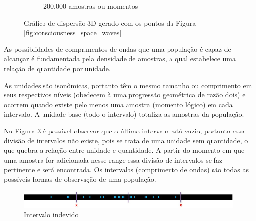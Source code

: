 \begin{figure}[H]
\begin{subfigure}[H]{0.47\linewidth}
		\caption{200.000 amostras ou momentos}
		\label{fig:consciousness_space_3DScatter_200000-2}
		\end{subfigure}%
	\caption{Gráfico de dispersão 3D gerado com os pontos da Figura \ref{fig:consciousness_space_waves}}
	\end{figure}

As possiblidades de comprimentos de ondas que uma população é capaz de alcançar é fundamentada pela densidade de amostras, a qual estabelece uma relação de quantidade por unidade. 

As unidades são isonômicas, portanto têm o mesmo tamanho ou comprimento em seus respectivos níveis (obedecem à uma progressão geométrica de razão dois) e ocorrem quando existe pelo menos uma amostra (momento lógico) em cada intervalo. A unidade base (todo o intervalo) totaliza as amostras da população. 

Na Figura \ref{fig:consciousness_space_subconsciousness_intervals} é possível observar que o último intervalo está vazio, portanto essa divisão de intervalos não existe, pois se trata de uma unidade sem quantidade, o que quebra a relação entre unidade e quantidade. A partir do momento em que uma amostra for adicionada nesse range essa divisão de intervalos se faz pertinente e será encontrada. Os intervalos (comprimento de ondas) são todas as possíveis formas de observação de uma população.
	\begin{figure}[H]
	\caption{Intervalo indevido}
	\label{fig:consciousness_space_subconsciousness_intervals}
	\centering
	\includegraphics[scale=.7]{sections/images/consciousness_space_subconsciousness_intervals.jpg}
	\end{figure}

